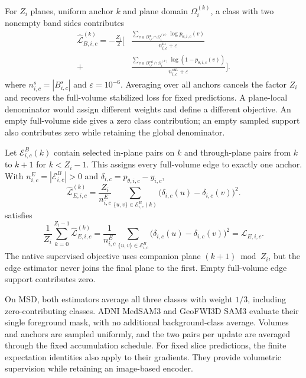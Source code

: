 \documentclass[12pt,a4paper]{article}
\begin{document}
For $Z_i$ planes, uniform anchor $k$ and plane domain
$\Omega_i^{(k)}$, a class with two nonempty band sides contributes
\begin{equation}
\begin{aligned}
\widehat{\mathcal{L}}_{B,i,c}^{(k)}
=-\frac{Z_i}{2}\Biggl[
 &\frac{\sum_{v\in B_{i,c}^{\mathrm{in}}\cap\Omega_i^{(k)}}
                  \log p_{\theta,i,c}(v)}
        {n_{i,c}^{\mathrm{in}}+\varepsilon}\\
 {}+{}&\frac{\sum_{v\in B_{i,c}^{\mathrm{out}}\cap\Omega_i^{(k)}}
                  \log(1-p_{\theta,i,c}(v))}
        {n_{i,c}^{\mathrm{out}}+\varepsilon}\Biggr].
\end{aligned}
\label{eq:medsam-sampled-band-loss}
\end{equation}
where $n_{i,c}^s=|B_{i,c}^s|$ and $\varepsilon=10^{-6}$.
Averaging over all anchors cancels the factor $Z_i$ and recovers
the full-volume stabilized loss for fixed predictions. A plane-local
denominator would assign different weights and define a different
objective. An empty full-volume side gives a zero class contribution;
an empty sampled support also contributes zero while retaining the
global denominator.

Let $\mathcal E_{i,c}^B(k)$ contain selected in-plane pairs on $k$
and through-plane pairs from $k$ to $k+1$ for $k<Z_i-1$.
This assigns every full-volume edge to exactly one anchor. With
$n_{i,c}^E=|\mathcal E_{i,c}^B|>0$ and
$\delta_{i,c}=p_{\theta,i,c}-y_{i,c}$,
\begin{equation}
\widehat{\mathcal{L}}_{E,i,c}^{(k)}
=\frac{Z_i}{n_{i,c}^E}
  \sum_{\{u,v\}\in\mathcal{E}_{i,c}^B(k)}
    \bigl(\delta_{i,c}(u)-\delta_{i,c}(v)\bigr)^2.
\label{eq:medsam-sampled-edge-loss}
\end{equation}
satisfies
\begin{equation}
\frac{1}{Z_i}\sum_{k=0}^{Z_i-1}
  \widehat{\mathcal{L}}_{E,i,c}^{(k)}
=\frac{1}{n_{i,c}^E}\sum_{\{u,v\}\in\mathcal{E}_{i,c}^B}
    \bigl(\delta_{i,c}(u)-\delta_{i,c}(v)\bigr)^2
=\mathcal{L}_{E,i,c}.
\label{eq:medsam-edge-expectation}
\end{equation}
The native supervised objective uses companion plane
$(k+1)\bmod Z_i$, but the edge estimator never joins the final
plane to the first. Empty full-volume edge support contributes zero.

On MSD, both estimators average all three classes with weight $1/3$,
including zero-contributing classes. ADNI MedSAM3 and GeoFWI3D SAM3
evaluate their single foreground mask, with no additional
background-class average. Volumes and anchors are sampled
uniformly, and the two pairs per update are averaged through the
fixed accumulation schedule. For fixed slice predictions, the finite
expectation identities also apply to their gradients. They provide
volumetric supervision while retaining an image-based encoder.
\end{document}

